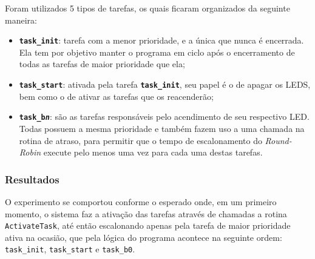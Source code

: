 \documentclass[conference,compsoc]{IEEEtran}
\newcommand{\reffig}[1]{Figura \ref{fig:#1}}
\newcommand{\figura}[5][Extraido de:]{
	\begin{figure}[h!tb]
		\centering
		\caption{#3.}
		\texttt{[image: \#2.png]}
		\ifthenelse{\isempty{#5}}{}{%
			\\ #1 \cite{#5}.
		}	
		\label{fig:#2}
	\end{figure}
}
\begin{document}
Foram utilizados 5 tipos de tarefas, os quais ficaram organizados da seguinte maneira:

\begin{itemize}
	\item \textbf{\texttt{task\_init}}: tarefa com a menor prioridade, e a única que nunca é encerrada. Ela tem por objetivo manter o programa em ciclo após o encerramento de todas as tarefas de maior prioridade que ela;
	\item \textbf{\texttt{task\_start}}: ativada pela tarefa \textbf{\texttt{task\_init}}, seu papel é o de apagar os LEDS, bem como o de ativar as tarefas que os reacenderão;
	\item \textbf{\texttt{task\_b\textit{n}}}: são as tarefas responsáveis pelo acendimento de seu respectivo LED. Todas possuem a mesma prioridade e também fazem uso a uma chamada na rotina de atraso, para permitir que o tempo de escalonamento do \emph{Round-Robin} execute pelo menos uma vez para cada uma destas tarefas.
\end{itemize}




\subsubsection{Resultados}

O experimento se comportou conforme o esperado onde, em um primeiro momento, o sistema faz a ativação das tarefas através de chamadas a rotina \texttt{ActivateTask}, até então escalonando apenas pela tarefa de maior prioridade ativa na ocasião, que pela lógica do programa acontece na seguinte ordem: \texttt{task\_init}, \texttt{task\_start} e \texttt{task\_b0}.
\end{document}
